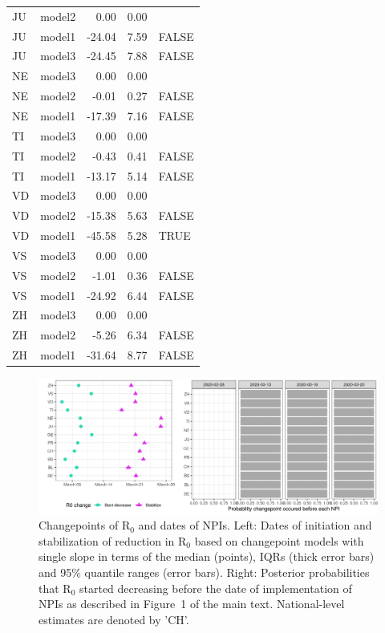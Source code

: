 \begin{table}[!htb]
\begin{tabular}{llrrl}
\addlinespace
JU & model2 & 0.00 & 0.00 & \\
JU & model1 & -24.04 & 7.59 & FALSE\\
JU & model3 & -24.45 & 7.88 & FALSE\\
\addlinespace
NE & model3 & 0.00 & 0.00 & \\
NE & model2 & -0.01 & 0.27 & FALSE\\
NE & model1 & -17.39 & 7.16 & FALSE\\
\addlinespace
TI & model3 & 0.00 & 0.00 & \\
TI & model2 & -0.43 & 0.41 & FALSE\\
TI & model1 & -13.17 & 5.14 & FALSE\\
\addlinespace
VD & model3 & 0.00 & 0.00 & \\
VD & model2 & -15.38 & 5.63 & FALSE\\
VD & model1 & -45.58 & 5.28 & TRUE\\
\addlinespace
VS & model3 & 0.00 & 0.00 & \\
VS & model2 & -1.01 & 0.36 & FALSE\\
VS & model1 & -24.92 & 6.44 & FALSE\\
\addlinespace
ZH & model3 & 0.00 & 0.00 & \\
ZH & model2 & -5.26 & 6.34 & FALSE\\
ZH & model1 & -31.64 & 8.77 & FALSE\\
\bottomrule
\end{tabular}
\end{table}

\begin{figure}[!htb]
    \centering
    \includegraphics[width = .8\textwidth]{fig_covid-switzerland-npi/fig_supp/r0_change_combined.png}
    \caption[Changepoints of R$_0$ and dates of NPIs]{Changepoints of R$_0$ and dates of NPIs. Left: Dates of initiation and stabilization of reduction in R$_0$ based on changepoint models with single slope in terms of the median (points), IQRs (thick error bars) and 95\% quantile ranges (error bars). Right: Posterior probabilities that R$_0$ started decreasing before the date of implementation of NPIs as described in Figure~1 of the main text. National-level estimates are denoted by 'CH'.}
    \label{fig:datechanger0}
\end{figure}

